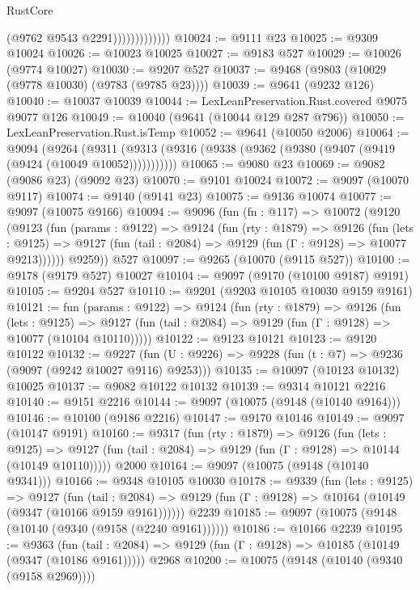 \begin{lexlean}{RustCore}
\begin{coremodule}
                            (@9762 @9543 @2291)))))))))))))
@10024 := @9111 @23
@10025 := @9309 @10024
@10026 := @10023 @10025
@10027 := @9183 @527
@10029 := @10026 (@9774 @10027)
@10030 := @9207 @527
@10037 := @9468 (@9803 (@10029 (@9778 @10030) (@9783 (@9785 @23))))
@10039 := @9641 (@9232 @126)
@10040 := @10037 @10039
@10044 := LexLeanPreservation.Rust.covered @9075 @9077 @126
@10049 := @10040 (@9641 (@10044 @129 @287 @796))
@10050 := LexLeanPreservation.Rust.isTemp
@10052 := @9641 (@10050 @2006)
@10064 := @9094
    (@9264 (@9311 (@9313 (@9316 (@9338 (@9362 (@9380 (@9407 (@9419 (@9424 (@10049 @10052)))))))))))
@10065 := @9080 @23
@10069 := @9082 (@9086 @23) (@9092 @23)
@10070 := @9101 @10024
@10072 := @9097 (@10070 @9117)
@10074 := @9140 (@9141 @23)
@10075 := @9136 @10074
@10077 := @9097 (@10075 @9166)
@10094 := @9096
    (fun (fn : @117) =>
    @10072
      (@9120
        (@9123
          (fun (params : @9122) =>
          @9124
            (fun (rty : @1879) =>
            @9126
              (fun (lets : @9125) =>
              @9127 (fun (tail : @2084) => @9129 (fun (Γ : @9128) => @10077 @9213))))))
        @9259))
    @527
@10097 := @9265 (@10070 (@9115 @527))
@10100 := @9178 (@9179 @527) @10027
@10104 := @9097 (@9170 (@10100 @9187) @9191)
@10105 := @9204 @527
@10110 := @9201 (@9203 @10105 @10030 @9159 @9161)
@10121 := fun (params : @9122) =>
  @9124
    (fun (rty : @1879) =>
    @9126
      (fun (lets : @9125) =>
      @9127 (fun (tail : @2084) => @9129 (fun (Γ : @9128) => @10077 (@10104 @10110)))))
@10122 := @9123 @10121
@10123 := @9120 @10122
@10132 := @9227
    (fun (U : @9226) => @9228 (fun (t : @7) => @9236 (@9097 (@9242 @10027 @9116) @9253)))
@10135 := @10097 (@10123 @10132) @10025
@10137 := @9082 @10122 @10132
@10139 := @9314 @10121 @2216
@10140 := @9151 @2216
@10144 := @9097 (@10075 (@9148 (@10140 @9164)))
@10146 := @10100 (@9186 @2216)
@10147 := @9170 @10146
@10149 := @9097 (@10147 @9191)
@10160 := @9317
    (fun (rty : @1879) =>
    @9126
      (fun (lets : @9125) =>
      @9127 (fun (tail : @2084) => @9129 (fun (Γ : @9128) => @10144 (@10149 @10110)))))
    @2000
@10164 := @9097 (@10075 (@9148 (@10140 @9341)))
@10166 := @9348 @10105 @10030
@10178 := @9339
    (fun (lets : @9125) =>
    @9127
      (fun (tail : @2084) =>
      @9129 (fun (Γ : @9128) => @10164 (@10149 (@9347 (@10166 @9159 @9161))))))
    @2239
@10185 := @9097 (@10075 (@9148 (@10140 (@9340 (@9158 (@2240 @9161))))))
@10186 := @10166 @2239
@10195 := @9363
    (fun (tail : @2084) => @9129 (fun (Γ : @9128) => @10185 (@10149 (@9347 (@10186 @9161)))))
    @2968
@10200 := @10075 (@9148 (@10140 (@9340 (@9158 @2969))))

\end{coremodule}
\end{lexlean}
